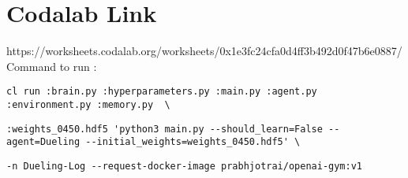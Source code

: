 \section{Codalab Link}
\label{sec:conclusion}

https://worksheets.codalab.org/worksheets/0x1e3fc24cfa0d4ff3b492d0f47b6e0887/
 \\
Command to run :\\



\begin{verbatim}
cl run :brain.py :hyperparameters.py :main.py :agent.py :environment.py :memory.py  \
\end{verbatim}
\begin{verbatim}
:weights_0450.hdf5 'python3 main.py --should_learn=False --agent=Dueling --initial_weights=weights_0450.hdf5' \
\end{verbatim}

\begin{verbatim}
-n Dueling-Log --request-docker-image prabhjotrai/openai-gym:v1 
\end{verbatim}

 